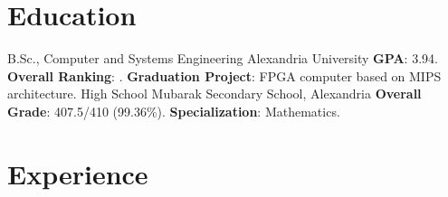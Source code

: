 \documentclass[letterpaper]{twentysecondcv} %
\begin{document}



\makeprofile


\section{Education}

\begin{twenty} %
               {B.Sc., Computer and Systems Engineering}
               {Alexandria University}
               {\textbf{GPA}: 3.94.\newline
                \textbf{Overall Ranking}: \underline{}.\newline
                \textbf{Graduation Project}: FPGA computer based on MIPS architecture.\newline
               }
               {High School}
               {Mubarak Secondary School, Alexandria}
               {\textbf{Overall Grade}: 407.5/410 (99.36\%).\newline
                \textbf{Specialization}: Mathematics.}
\end{twenty}


\section{Experience}
\end{document}
